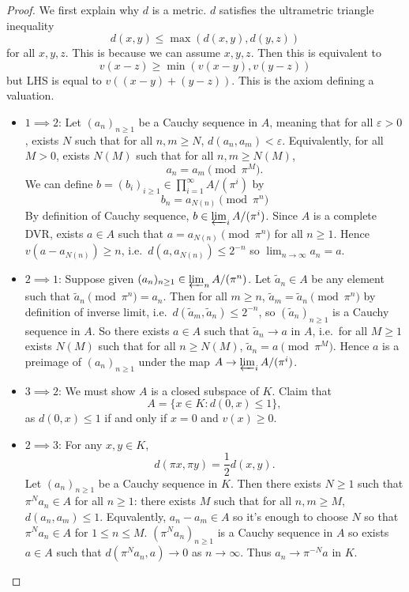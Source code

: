 \documentclass[a4paper]{article}
\begin{document}
\begin{proof}
  We first explain why \(d\) is a metric. \(d\) satisfies the ultrametric triangle inequality
  \[
    d(x, y) \leq \max(d(x, y), d(y, z))
  \]
  for all \(x, y, z\). This is because we can assume \(x, y, z\). Then this is equivalent to
  \[
    v(x - z) \geq \min(v(x - y), v(y - z))
  \]
  but LHS is equal to \(v((x - y) + (y - z))\). This is the axiom defining a valuation.
  \begin{itemize}
  \item \(1 \implies 2\): Let \((a_n)_{n \geq 1}\) be a Cauchy sequence in \(A\), meaning that for all \(\varepsilon > 0\), exists \(N\) such that for all \(n, m \geq N\), \(d(a_n, a_m) < \varepsilon\). Equivalently, for all \(M > 0\), exists \(N(M)\) such that for all \(n, m \geq N(M)\),
    \[
      a_n = a_m \pmod{\pi^M}.
    \]
    We can define \(b = (b_i)_{i \geq 1} \in \prod_{i = 1}^\infty A/(\pi^i)\) by
    \[
      b_n = a_{N(n)} \pmod {\pi^n}
    \]
    By definition of Cauchy sequence, \(b \in \varprojlim_i A/(\pi^i)\). Since \(A\) is a complete DVR, exists \(a \in A\) such that \(a = a_{N(n)} \pmod{\pi^n}\) for all \(n \geq 1\). Hence \(v(a - a_{N(n)}) \geq n\), i.e.\ \(d(a, a_{N(n)}) \leq 2^{-n}\) so \(\lim_{n \to \infty} a_n = a\).
  \item \(2 \implies 1\): Suppose given \((a_n)_{n \geq 1} \in \varprojlim_n A/(\pi^n)\). Let \(\tilde a_n \in A\) be any element such that \(\tilde a_n \pmod{\pi^n} = a_n\). Then for all \(m \geq n\), \(\tilde a_m = \tilde a_n \pmod{\pi^n}\) by definition of inverse limit, i.e.\ \(d(\tilde a_m, \tilde a_n) \leq 2^{-n}\), so \((\tilde a_n)_{n \geq 1}\) is a Cauchy sequence in \(A\). So there exists \(a \in A\) such that \(\tilde a_n \to a\) in \(A\), i.e.\ for all \(M \geq 1\) exists \(N(M)\) such that for all \(n \geq N(M)\), \(\tilde a_n = a \pmod{\pi^M}\). Hence \(a\) is a preimage of \((a_n)_{n \geq 1}\) under the map \(A \to \varprojlim_i A/(\pi^i)\).
  \item \(3 \implies 2\): We must show \(A\) is a closed subspace of \(K\). Claim that
    \[
      A = \{x \in K: d(0, x) \leq 1\},
    \]
    as \(d(0, x) \leq 1\) if and only if \(x = 0\) and \(v(x) \geq 0\).
  \item \(2 \implies 3\): For any \(x, y \in K\),
    \[
      d(\pi x, \pi y) = \frac{1}{2} d(x, y).
    \]
    Let \((a_n)_{n \geq 1}\) be a Cauchy sequence in \(K\). Then there exists \(N \geq 1\) such that \(\pi^N a_n \in A\) for all \(n \geq 1\): there exists \(M\) such that for all \(n, m \geq M\), \(d(a_n, a_m) \leq 1\). Equvalently, \(a_n - a_m \in A\) so it's enough to choose \(N\) so that \(\pi^N a_n \in A\) for \(1 \leq n \leq M\). \((\pi^N a_n)_{n \geq 1}\) is a Cauchy sequence in \(A\) so exists \(a \in A\) such that \(d(\pi^N a_n, a) \to 0\) as \(n \to \infty\). Thus \(a_n \to \pi^{-N} a\) in \(K\).
  \end{itemize}
\end{proof}
\end{document}
